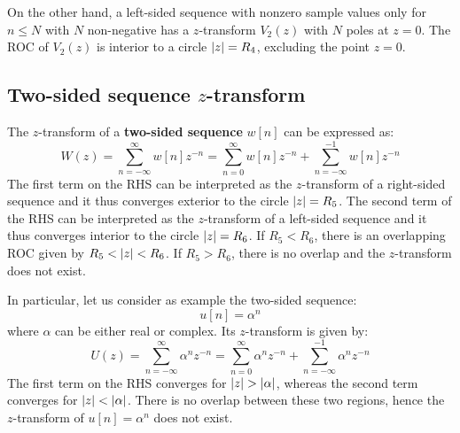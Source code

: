 \documentclass[../../main/main.tex]{subfiles}
\begin{document}
On the other hand, a left-sided sequence with nonzero sample values only for \( n \le N \) with \( N \) non-negative has a \( z \)-transform \( V_{2}(z) \) with \( N \) poles at \( z = 0 \).
The ROC of \( V_{2}(z) \) is interior to a circle \( \abs{z} = R_{4} \), excluding the point \( z = 0 \).



\subsection{\boldmath Two-sided sequence \( z \)-transform}
The \( z \)-transform of a \textbf{two-sided sequence} \( w[n] \) can be expressed as:
\begin{equation}
    W(z)
    =
    \sum_{n=-\infty}^{\infty} w[n]z^{-n}
    =
    \sum_{n=0}^{\infty} w[n]z^{-n} + \sum_{n=-\infty}^{-1} w[n]z^{-n}
    \label{eq:L14_S36_1}
\end{equation}
The first term on the RHS can be interpreted as the \( z \)-transform of a right-sided sequence and it thus converges exterior to the circle \( \abs{z} = R_{5} \). The second term of the RHS can be interpreted as the \( z \)-transform of a left-sided sequence and it thus converges interior to the circle \( \abs{z} = R_{6} \).
If \( R_{5} < R_{6} \), there is an overlapping ROC given  by \( R_{5} < \abs{z} < R_{6} \). If \( R_{5} > R_{6} \), there is no overlap and the \( z \)-transform does not exist.

In particular, let us consider as example the two-sided sequence:
\begin{equation}
    u[n]
    =
    \alpha^{n}
    \label{eq:L14_S38_1}
\end{equation}
where \( \alpha \) can be either real or complex. Its \( z \)-transform is given by:
\begin{equation}
    U(z)
    =
    \sum_{n=-\infty}^{\infty} \alpha^{n}z^{-n}
    =
    \sum_{n=0}^{\infty} \alpha^{n}z^{-n} + \sum_{n=-\infty}^{-1} \alpha^{n}z^{-n}
    \label{eq:L14_S38_2}
\end{equation}
The first term on the RHS converges for \( \abs{z} > \abs{\alpha} \), whereas the second term converges for \( \abs{z} < \abs{\alpha} \). There is no overlap between these two regions, hence the \( z \)-transform of \( u[n] = \alpha^{n} \) does not exist.
\end{document}
